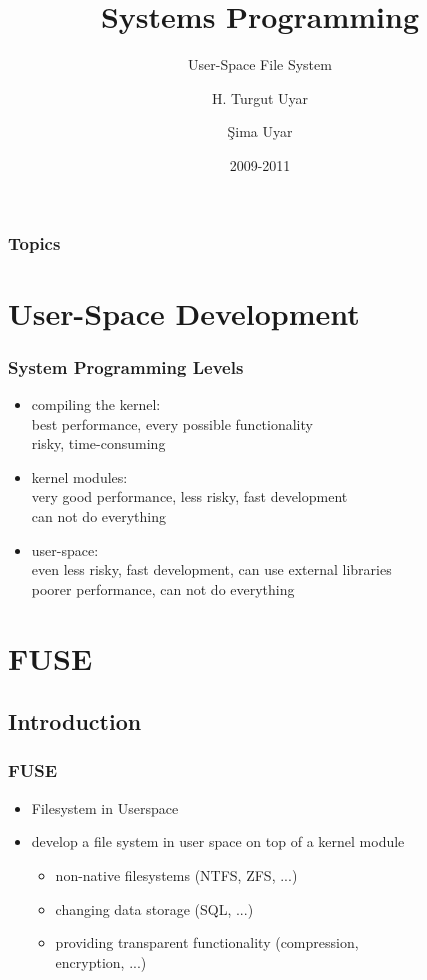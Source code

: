 \documentclass[dvipsnames]{beamer}
\title{Systems Programming}
\subtitle{User-Space File System}
\author{H. Turgut Uyar \and Şima Uyar}
\date{2009-2011}
\begin{document}
\begin{frame}
  \titlepage
\end{frame}

\begin{frame}
  \frametitle{Topics}
  \tableofcontents
\end{frame}

\section{User-Space Development}

\begin{frame}
  \frametitle{System Programming Levels}

  \begin{itemize}
    \item compiling the kernel:\\
      best performance, every possible functionality\\
      risky, time-consuming
    \item kernel modules:\\
      very good performance, less risky, fast development\\
      can not do everything

    \pause
    \item user-space:\\
      even less risky, fast development, can use external libraries\\
      poorer performance, can not do everything
  \end{itemize}
\end{frame}

\section{FUSE}

\subsection{Introduction}

\begin{frame}
  \frametitle{FUSE}

  \begin{itemize}
    \item Filesystem in Userspace
    \item develop a file system in user space on top of a kernel module

    \pause
    \begin{itemize}
      \item non-native filesystems (NTFS, ZFS, ...)
      \item changing data storage (SQL, ...)
      \item providing transparent functionality (compression,\\
        encryption, ...)
    \end{itemize}
  \end{itemize}
\end{frame}
\end{document}
